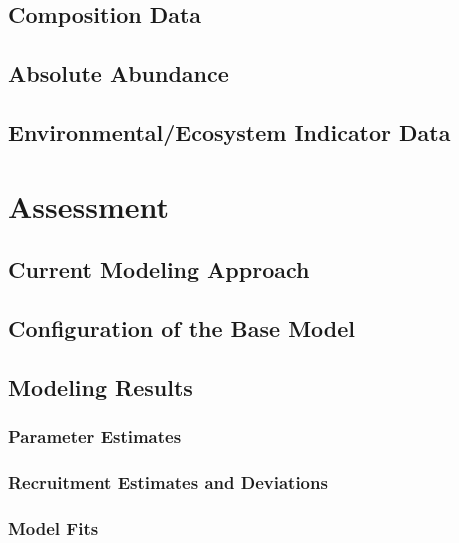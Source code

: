 \documentclass[
]{scrartcl}
\begin{document}
\subsection{Composition Data}\label{composition-data}

\subsection{Absolute Abundance}\label{absolute-abundance}

\subsection{Environmental/Ecosystem Indicator
Data}\label{environmentalecosystem-indicator-data}

\newpage{}

\section{Assessment}\label{sec-assmt-config}

\subsection{Current Modeling Approach}\label{current-modeling-approach}

\subsection{Configuration of the Base
Model}\label{configuration-of-the-base-model}

\newpage{}

\subsection{Modeling Results}\label{sec-assmt-results}

\subsubsection{Parameter Estimates}\label{parameter-estimates}

\subsubsection{Recruitment Estimates and
Deviations}\label{recruitment-estimates-and-deviations}

\subsubsection{Model Fits}\label{model-fits}
\end{document}
